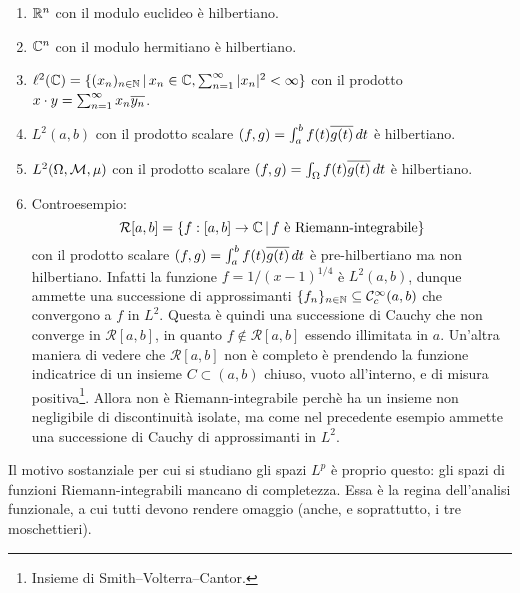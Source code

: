 \begin{example}
	\leavevmode
	\begin{enumerate}
		\item $\mathbb{R}^n$ con il modulo euclideo è hilbertiano.
		\item $\mathbb{C}^n$ con il modulo hermitiano è hilbertiano.
		\item $\ell^2(\mathbb{C}) = \{ (x_n)_{n \in \mathbb{N}} \,|\, x_n \in \mathbb{C}, \sum_{n=1}^\infty |x_n|^2 < \infty\}$ con il prodotto $x \cdot y = \sum_{n=1}^\infty x_n \overline{y_n}$.
		\item $L^2(a,b)$ con il prodotto scalare $(f,g) = \int_a^b f(t)\overline{g(t)}\,dt$ è hilbertiano.
		\item $L^2(\Omega, \mathcal{M}, \mu)$ con il prodotto scalare $(f,g) = \int_\Omega f(t)\overline{g(t)}\,dt$ è hilbertiano.
		\item Controesempio:
		\begin{equation*}
			\mathcal R[a,b] = \{f :[a,b] \to \mathbb{C} \,|\, \text{$f$ è Riemann-integrabile} \}
		\end{equation*}
		con il prodotto scalare $(f,g) = \int_a^b f(t)\overline{g(t)}\,dt$ è pre-hilbertiano ma non hilbertiano.
		Infatti la funzione $f = 1/(x-1)^{1/4}$ è $L^2(a,b)$, dunque ammette una successione di approssimanti $\{f_n\}_{n \in \mathbb{N}} \subseteq \mathcal{C}^\infty_c(a,b)$ che convergono a $f$ in $L^2$. Questa è quindi una successione di Cauchy che non converge in $\mathcal R[a,b]$, in quanto $f \notin \mathcal R[a,b]$ essendo illimitata in $a$.
		Un'altra maniera di vedere che $\mathcal R[a,b]$ non è completo è prendendo la funzione indicatrice di un insieme $C \subset (a,b)$ chiuso, vuoto all'interno, e di misura positiva\footnote{Insieme di Smith--Volterra--Cantor.}. Allora non è Riemann-integrabile perchè ha un insieme non negligibile di discontinuità isolate, ma come nel precedente esempio ammette una successione di Cauchy di approssimanti in $L^2$.
	\end{enumerate}
\end{example}

\begin{remark}
	Il motivo sostanziale per cui si studiano gli spazi $L^p$ è proprio questo: gli spazi di funzioni Riemann-integrabili mancano di completezza. Essa è la regina dell'analisi funzionale, a cui tutti devono rendere omaggio (anche, e soprattutto, i tre moschettieri).
\end{remark}

